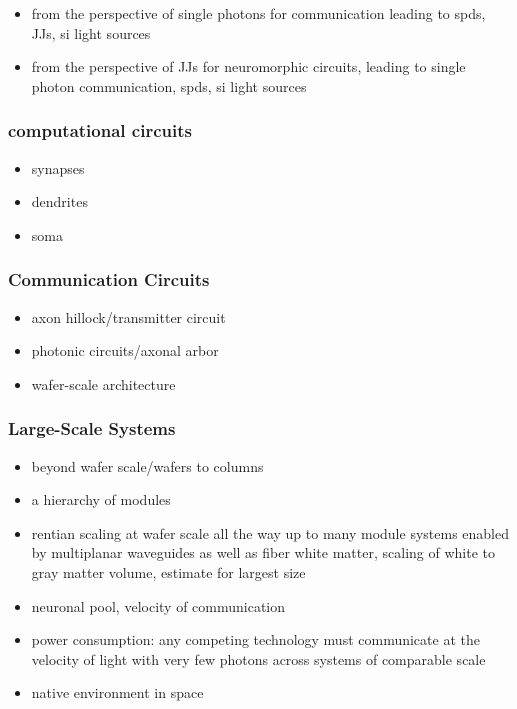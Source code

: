 \begin{itemize}
\item from the perspective of single photons for communication leading to spds, JJs, si light sources
\item from the perspective of JJs for neuromorphic circuits, leading to single photon communication, spds, si light sources
\end{itemize}

\subsubsection{computational circuits}
\begin{itemize}
\item synapses
\item dendrites
\item soma
\end{itemize}

\subsubsection{Communication Circuits}
\begin{itemize}
\item axon hillock/transmitter circuit
\item photonic circuits/axonal arbor
\item wafer-scale architecture
\end{itemize}

\subsubsection{Large-Scale Systems}
\begin{itemize}
\item beyond wafer scale/wafers to columns
\item a hierarchy of modules
\item rentian scaling at wafer scale all the way up to many module systems enabled by multiplanar waveguides as well as fiber white matter, scaling of white to gray matter volume, estimate for largest size
\item neuronal pool, velocity of communication
\item power consumption: any competing technology must communicate at the velocity of light with very few photons across systems of comparable scale
\item native environment in space
\end{itemize}

